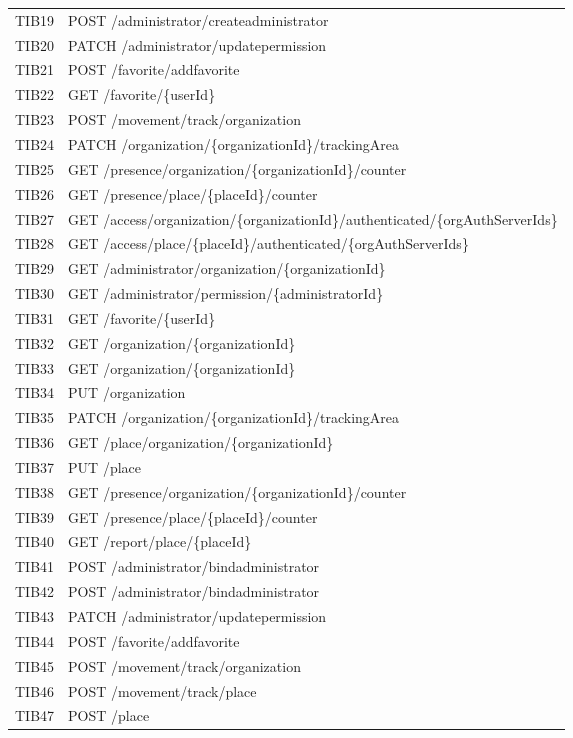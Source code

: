 {\begin{longtable}{C{2cm} C{12cm}}
	TIB19 & POST /administrator/createadministrator \\
	TIB20 & PATCH /administrator/updatepermission \\
	TIB21 & POST /favorite/addfavorite \\
	TIB22 & GET /favorite/\{userId\} \\
	TIB23 & POST /movement/track/organization \\
	TIB24 & PATCH /organization/\{organizationId\}/trackingArea \\
	TIB25 & GET /presence/organization/\{organizationId\}/counter \\
	TIB26 & GET /presence/place/\{placeId\}/counter \\
	TIB27 & GET /access/organization/\{organizationId\}/authenticated/\{orgAuthServerIds\} \\
	TIB28 & GET /access/place/\{placeId\}/authenticated/\{orgAuthServerIds\} \\
	TIB29 & GET /administrator/organization/\{organizationId\} \\
	TIB30 & GET /administrator/permission/\{administratorId\} \\
	TIB31 & GET /favorite/\{userId\} \\
	TIB32 & GET /organization/\{organizationId\} \\
	TIB33 & GET /organization/\{organizationId\} \\
	TIB34 & PUT /organization \\
	TIB35 & PATCH /organization/\{organizationId\}/trackingArea \\
	TIB36 & GET /place/organization/\{organizationId\} \\
	TIB37 & PUT /place \\
	TIB38 & GET /presence/organization/\{organizationId\}/counter \\
	TIB39 & GET /presence/place/\{placeId\}/counter \\
	TIB40 & GET /report/place/\{placeId\} \\
	TIB41 & POST /administrator/bindadministrator \\
	TIB42 & POST /administrator/bindadministrator \\
	TIB43 & PATCH /administrator/updatepermission \\
	TIB44 & POST /favorite/addfavorite \\
	TIB45 & POST /movement/track/organization \\
	TIB46 & POST /movement/track/place \\
	TIB47 & POST /place \\

\end{longtable}}
